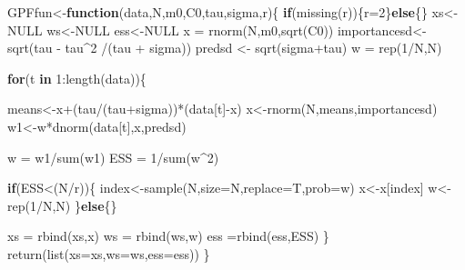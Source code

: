 \documentclass[
]{book}
\newenvironment{Shaded}{\begin{snugshade}}{\end{snugshade}}
\newcommand{\AttributeTok}[1]{\textcolor[rgb]{0.77,0.63,0.00}{#1}}
\newcommand{\ConstantTok}[1]{\textcolor[rgb]{0.00,0.00,0.00}{#1}}
\newcommand{\ControlFlowTok}[1]{\textcolor[rgb]{0.13,0.29,0.53}{\textbf{#1}}}
\newcommand{\DecValTok}[1]{\textcolor[rgb]{0.00,0.00,0.81}{#1}}
\newcommand{\FunctionTok}[1]{\textcolor[rgb]{0.00,0.00,0.00}{#1}}
\newcommand{\NormalTok}[1]{#1}
\newcommand{\OtherTok}[1]{\textcolor[rgb]{0.56,0.35,0.01}{#1}}
\newcommand{\SpecialCharTok}[1]{\textcolor[rgb]{0.00,0.00,0.00}{#1}}
\theoremstyle{break}
\theoremstyle{nonumberplain}
\begin{document}
\begin{Shaded}
\begin{Highlighting}[]
\NormalTok{GPFfun}\OtherTok{\textless{}{-}}\ControlFlowTok{function}\NormalTok{(data,N,m0,C0,tau,sigma,r)\{}
  \ControlFlowTok{if}\NormalTok{(}\FunctionTok{missing}\NormalTok{(r))\{r}\OtherTok{=}\DecValTok{2}\NormalTok{\}}\ControlFlowTok{else}\NormalTok{\{\}}
\NormalTok{  xs}\OtherTok{\textless{}{-}}\ConstantTok{NULL}
\NormalTok{  ws}\OtherTok{\textless{}{-}}\ConstantTok{NULL}
\NormalTok{  ess}\OtherTok{\textless{}{-}}\ConstantTok{NULL}
\NormalTok{  x  }\OtherTok{=} \FunctionTok{rnorm}\NormalTok{(N,m0,}\FunctionTok{sqrt}\NormalTok{(C0))}
\NormalTok{  importancesd}\OtherTok{\textless{}{-}}\FunctionTok{sqrt}\NormalTok{(tau }\SpecialCharTok{{-}}\NormalTok{ tau}\SpecialCharTok{\^{}}\DecValTok{2} \SpecialCharTok{/}\NormalTok{(tau }\SpecialCharTok{+}\NormalTok{ sigma))}
\NormalTok{  predsd }\OtherTok{\textless{}{-}} \FunctionTok{sqrt}\NormalTok{(sigma}\SpecialCharTok{+}\NormalTok{tau)}
\NormalTok{  w  }\OtherTok{=} \FunctionTok{rep}\NormalTok{(}\DecValTok{1}\SpecialCharTok{/}\NormalTok{N,N)}
  
  \ControlFlowTok{for}\NormalTok{(t }\ControlFlowTok{in} \DecValTok{1}\SpecialCharTok{:}\FunctionTok{length}\NormalTok{(data))\{}
    
\NormalTok{    means}\OtherTok{\textless{}{-}}\NormalTok{x}\SpecialCharTok{+}\NormalTok{(tau}\SpecialCharTok{/}\NormalTok{(tau}\SpecialCharTok{+}\NormalTok{sigma))}\SpecialCharTok{*}\NormalTok{(data[t]}\SpecialCharTok{{-}}\NormalTok{x)}
\NormalTok{    x}\OtherTok{\textless{}{-}}\FunctionTok{rnorm}\NormalTok{(N,means,importancesd)}
\NormalTok{    w1}\OtherTok{\textless{}{-}}\NormalTok{w}\SpecialCharTok{*}\FunctionTok{dnorm}\NormalTok{(data[t],x,predsd)}
    
\NormalTok{    w }\OtherTok{=}\NormalTok{ w1}\SpecialCharTok{/}\FunctionTok{sum}\NormalTok{(w1)}
\NormalTok{    ESS  }\OtherTok{=} \DecValTok{1}\SpecialCharTok{/}\FunctionTok{sum}\NormalTok{(w}\SpecialCharTok{\^{}}\DecValTok{2}\NormalTok{)}
    
    \ControlFlowTok{if}\NormalTok{(ESS}\SpecialCharTok{\textless{}}\NormalTok{(N}\SpecialCharTok{/}\NormalTok{r))\{}
\NormalTok{      index}\OtherTok{\textless{}{-}}\FunctionTok{sample}\NormalTok{(N,}\AttributeTok{size=}\NormalTok{N,}\AttributeTok{replace=}\NormalTok{T,}\AttributeTok{prob=}\NormalTok{w)}
\NormalTok{      x}\OtherTok{\textless{}{-}}\NormalTok{x[index]}
\NormalTok{      w}\OtherTok{\textless{}{-}}\FunctionTok{rep}\NormalTok{(}\DecValTok{1}\SpecialCharTok{/}\NormalTok{N,N)}
\NormalTok{    \}}\ControlFlowTok{else}\NormalTok{\{\}}
    
\NormalTok{    xs }\OtherTok{=} \FunctionTok{rbind}\NormalTok{(xs,x)}
\NormalTok{    ws }\OtherTok{=} \FunctionTok{rbind}\NormalTok{(ws,w)}
\NormalTok{    ess }\OtherTok{=}\FunctionTok{rbind}\NormalTok{(ess,ESS)}
\NormalTok{  \}}
  \FunctionTok{return}\NormalTok{(}\FunctionTok{list}\NormalTok{(}\AttributeTok{xs=}\NormalTok{xs,}\AttributeTok{ws=}\NormalTok{ws,}\AttributeTok{ess=}\NormalTok{ess))}
\NormalTok{\}}
\end{Highlighting}
\end{Shaded}
\end{document}
